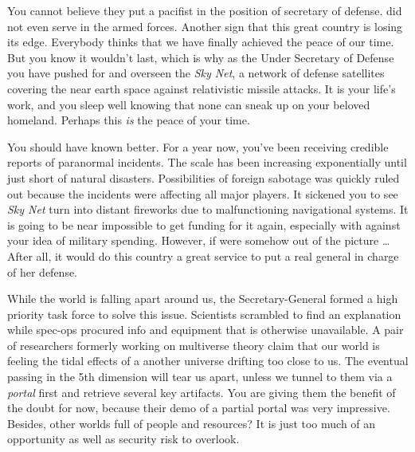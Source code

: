 \documentclass[char]{guildcamp3}
\begin{document}
\name{\cPoliTwo{}}




You cannot believe they put a pacifist in the position of secretary of defense. \cPoliOne{\intro} did not even serve in the armed forces. Another sign that this great country is losing its edge. Everybody thinks that we have finally achieved the peace of our time. But you know it wouldn't last, which is why as the Under Secretary of Defense you have pushed for and overseen the \emph{Sky Net}, a network of defense satellites covering the near earth space against relativistic missile attacks. It is your life's work, and you sleep well knowing that none can sneak up on your beloved homeland. Perhaps this \emph{is} the peace of your time. 

You should have known better. For a year now, you've been receiving credible reports of paranormal incidents. The scale has been increasing exponentially until just short of natural disasters. Possibilities of foreign sabotage was quickly ruled out because the incidents were affecting all major players. It sickened you to see \emph{Sky Net} turn into distant fireworks due to malfunctioning navigational systems. It is going to be near impossible to get funding for it again, especially with \cPoliOne{} against your idea of military spending. However, if \cPoliOne{} were somehow out of the picture \ldots  After all, it would do this country a great service to put a real general in charge of her defense.

While the world is falling apart around us, the Secretary-General formed a high priority task force to solve this issue. Scientists scrambled to find an explanation while spec-ops procured info and equipment that is otherwise unavailable. A pair of researchers formerly working on multiverse theory claim that our world is feeling the tidal effects of a another universe drifting too close to us. The eventual passing in the 5th dimension will tear us apart, unless we tunnel to them via a \emph{portal} first and retrieve several key artifacts. You are giving them the benefit of the doubt for now, because their demo of a partial portal was very impressive. Besides, other worlds full of people and resources? It is just too much of an opportunity as well as security risk to overlook. 
\end{document}
